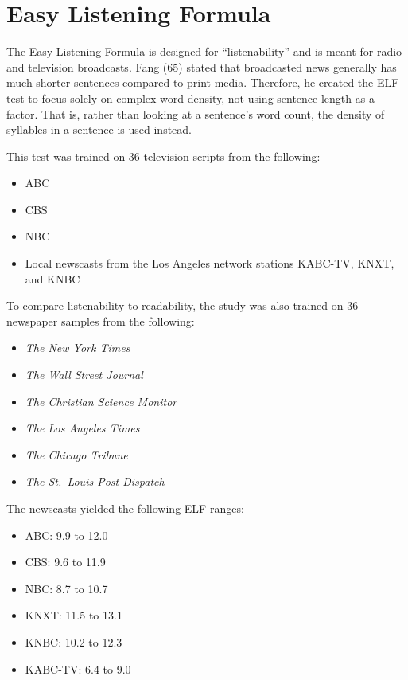 \documentclass[
]{book}
\providecommand{\tightlist}{%
  \setlength{\itemsep}{0pt}\setlength{\parskip}{0pt}}
\theoremstyle{definition}
\theoremstyle{definition}
\theoremstyle{definition}
\theoremstyle{definition}
\theoremstyle{remark}
\begin{document}

\newpage

\hypertarget{easy-listening-formula}{%
\section{\texorpdfstring{Easy Listening Formula}{Easy Listening Formula}}\label{easy-listening-formula}}

The Easy Listening Formula is designed for ``listenability'' and is meant for radio and television broadcasts. Fang (65) stated that broadcasted news generally has much shorter sentences compared to print media. Therefore, he created the ELF test to focus solely on complex-word density, not using sentence length as a factor. That is, rather than looking at a sentence's word count, the density of syllables in a sentence is used instead.

This test was trained on 36 television scripts from the following:

\begin{itemize}
\tightlist
\item
  ABC
\item
  CBS
\item
  NBC
\item
  Local newscasts from the Los Angeles network stations KABC-TV, KNXT, and KNBC
\end{itemize}

To compare listenability to readability, the study was also trained on 36 newspaper samples from the following:

\begin{itemize}
\tightlist
\item
  \emph{The New York Times}
\item
  \emph{The Wall Street Journal}
\item
  \emph{The Christian Science Monitor}
\item
  \emph{The Los Angeles Times}
\item
  \emph{The Chicago Tribune}
\item
  \emph{The St.~Louis Post-Dispatch}
\end{itemize}

The newscasts yielded the following ELF ranges:

\begin{itemize}
\tightlist
\item
  ABC: 9.9 to 12.0
\item
  CBS: 9.6 to 11.9
\item
  NBC: 8.7 to 10.7
\item
  KNXT: 11.5 to 13.1
\item
  KNBC: 10.2 to 12.3
\item
  KABC-TV: 6.4 to 9.0
\end{itemize}
\end{document}
